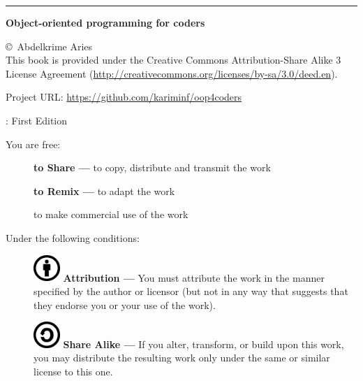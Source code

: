 \documentclass[12pt]{book}
\begin{document}
\fi

\newpage
\hrule
{}
\begin{flushright}
{\Huge \textbf{Object-oriented programming for coders}}
\end{flushright}

\vfill

  \copyright\ Abdelkrime Aries \\[0.5cm]
This book is provided under the Creative Commons Attribution-Share Alike 3 License Agreement (\url{http://creativecommons.org/licenses/by-sa/3.0/deed.en}).

\vspace{0.5cm}
\noindent
Project URL: \url{https://github.com/kariminf/oop4coders}

\vspace{1cm}
: \hspace{2cm} First Edition

\vspace{1cm}
\noindent
You are free:
\begin{description}
\item[] \textbf{to Share —} to copy, distribute and transmit the work
\item[] \textbf{to Remix —} to adapt the work
\item[] to make commercial use of the work
\end{description}

\vspace{1cm}
\noindent
Under the following conditions:
\begin{description}
\item[] \includegraphics[width=1cm]{img/by.png}
\textbf{Attribution —} You must attribute the work in the manner specified by the author or licensor (but not in any way that suggests that they endorse you or your use of the work).

\item[] \includegraphics[width=1cm]{img/sa.png}
\textbf{Share Alike —} If you alter, transform, or build upon this work, you may distribute the resulting work only under the same or similar license to this one.
\end{description}
\end{document}
